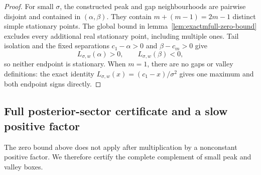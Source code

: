 \documentclass{iopjournal}
\theoremstyle{plain}
\theoremstyle{definition}
\begin{document}
\begin{proof}
For small \(\sigma\), the constructed peak and gap neighbourhoods are
pairwise disjoint and contained in \((\alpha,\beta)\).  They contain
\(m+(m-1)=2m-1\) distinct simple stationary points.  The global bound in
lemma~\ref{lem:exactmfull-zero-bound} excludes every additional real
stationary point, including multiple ones.  Tail isolation and the fixed
separations \(c_1-\alpha>0\) and \(\beta-c_m>0\) give
\begin{equation}
 L_{\sigma,w}(\alpha)>0,
 \qquad L_{\sigma,w}(\beta)<0,
 \label{eq:exactmfull-endpoint-signs}
\end{equation}
so neither endpoint is stationary.  When \(m=1\), there are no gaps or
valley definitions: the exact identity
\(L_{\sigma,w}(x)=(c_1-x)/\sigma^2\) gives one maximum and both endpoint
signs directly.
\end{proof}

\subsection{Full posterior-sector certificate and a slow positive factor}
\label{subsec:exactmfull-slow-factor}

The zero bound above does not apply after multiplication by a nonconstant
positive factor.  We therefore certify the complete complement of small peak
and valley boxes.
\end{document}
